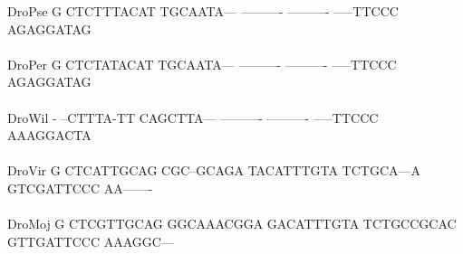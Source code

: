 \documentclass[11pt,twoside,reqno,a4paper]{article}
\begin{document}
{DroPse	G	CTCTTTACAT	TGCAATA---	----------	----------	-----TTCCC	AGAGGATAG\\
\hspace*{7\charwidth}\hspace*{1\charwidth}\hspace*{1\charwidth}\hspace*{1\charwidth}\hspace*{1\charwidth}\hspace*{1\charwidth}\hspace*{1\charwidth}\\
DroPer	G	CTCTATACAT	TGCAATA---	----------	----------	-----TTCCC	AGAGGATAG\\
\hspace*{7\charwidth}\hspace*{1\charwidth}\hspace*{1\charwidth}\hspace*{1\charwidth}\hspace*{1\charwidth}\hspace*{1\charwidth}\hspace*{1\charwidth}\\
DroWil	-	--CTTTA-TT	CAGCTTA---	----------	----------	-----TTCCC	AAAGGACTA\\
\hspace*{7\charwidth}\hspace*{1\charwidth}\hspace*{1\charwidth}\hspace*{1\charwidth}\hspace*{1\charwidth}\hspace*{1\charwidth}\hspace*{1\charwidth}\\
DroVir	G	CTCATTGCAG	CGC--GCAGA	TACATTTGTA	TCTGCA---A	GTCGATTCCC	AA-------\\
\hspace*{7\charwidth}\hspace*{1\charwidth}\hspace*{1\charwidth}\hspace*{1\charwidth}\hspace*{1\charwidth}\hspace*{1\charwidth}\hspace*{1\charwidth}\\
DroMoj	G	CTCGTTGCAG	GGCAAACGGA	GACATTTGTA	TCTGCCGCAC	GTTGATTCCC	AAAGGC---\\
\hspace*{7\charwidth}\hspace*{1\charwidth}\hspace*{1\charwidth}\hspace*{1\charwidth}\hspace*{1\charwidth}\hspace*{1\charwidth}\hspace*{1\charwidth}\\
}
\end{document}
